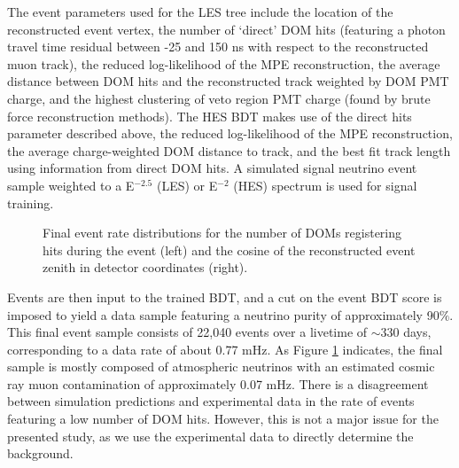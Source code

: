 \documentclass[manuscript]{aastex}
\begin{document}
The event parameters used for the LES tree include the location of the reconstructed event vertex, the number of `direct' DOM hits (featuring a photon travel time residual between -25 and 150 ns with respect to the reconstructed muon track), the reduced log-likelihood of the MPE reconstruction, the average distance between DOM hits and the reconstructed track weighted by DOM PMT charge, and the highest clustering of veto region PMT charge (found by brute force reconstruction methods). The HES BDT makes use of the direct hits parameter described above, the reduced log-likelihood of the MPE reconstruction, the average charge-weighted DOM distance to track, and the best fit track length using information from direct DOM hits. A simulated signal neutrino event sample weighted to a E$^{-2.5}$ (LES) or E$^{-2}$ (HES) spectrum is used for signal training.
\begin{figure}[ht]
\caption[Final Sample Event Parameter Distributions]{Final event rate distributions for the number of DOMs registering hits during the event (left) and the cosine of the reconstructed event zenith in detector coordinates (right).}
\label{fig:PostBDTDistributions}
\end{figure}

Events are then input to the trained BDT, and a cut on the event BDT score is imposed to yield a data sample featuring a neutrino purity of approximately 90$\%$. This final event sample consists of 22,040 events over a livetime of $\sim$330 days, corresponding to a data rate of about 0.77 mHz. As Figure \ref{fig:PostBDTDistributions} indicates, the final sample is mostly composed of atmospheric neutrinos with an estimated cosmic ray muon contamination of approximately 0.07 mHz. There is a disagreement between simulation predictions and experimental data in the rate of events featuring a low number of DOM hits. However, this is not a major issue for the presented study, as we use the experimental data to directly determine the background.
\end{document}
